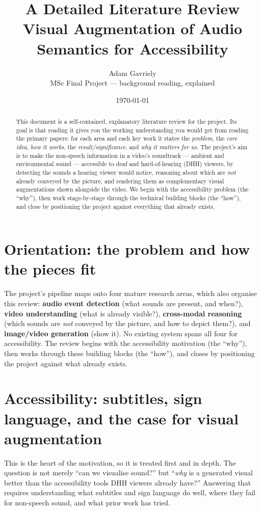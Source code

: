 \documentclass[11pt,a4paper]{article}
\title{\textbf{A Detailed Literature Review}\\[4pt]
\large Visual Augmentation of Audio Semantics for Accessibility}
\author{Adam Gavriely \\ \small MSc Final Project --- background reading, explained}
\date{\today}
\begin{document}
\maketitle

\begin{abstract}
\noindent This document is a self-contained, explanatory literature review for the project. Its goal
is that reading it gives you the working understanding you would get from reading the primary papers:
for each area and each key work it states the \emph{problem}, the \emph{core idea}, \emph{how it
works}, the \emph{result/significance}, and \emph{why it matters for us}. The project's aim is to make
the non-speech information in a video's soundtrack --- ambient and environmental sound --- accessible
to deaf and hard-of-hearing (DHH) viewers, by detecting the sounds a hearing viewer would notice,
reasoning about which are \emph{not} already conveyed by the picture, and rendering them as
complementary visual augmentations shown alongside the video. We begin with the accessibility problem
(the ``why''), then work stage-by-stage through the technical building blocks (the ``how''), and
close by positioning the project against everything that already exists.
\end{abstract}

\tableofcontents

\section{Orientation: the problem and how the pieces fit}
The project's pipeline maps onto four mature research areas, which also organise this review:
\textbf{audio event detection} (what sounds are present, and when?), \textbf{video understanding}
(what is already visible?), \textbf{cross-modal reasoning} (which sounds are \emph{not} conveyed by
the picture, and how to depict them?), and \textbf{image/video generation} (show it). No existing
system spans all four for accessibility. The review begins with the accessibility motivation (the
``why''), then works through these building blocks (the ``how''), and closes by positioning the
project against what already exists.

\section{Accessibility: subtitles, sign language, and the case for visual augmentation}
This is the heart of the motivation, so it is treated first and in depth. The question is not merely
``can we visualise sound?'' but ``\emph{why} is a generated visual better than the accessibility tools
DHH viewers already have?'' Answering that requires understanding what subtitles and sign language do
well, where they fail for non-speech sound, and what prior work has tried.
\end{document}

